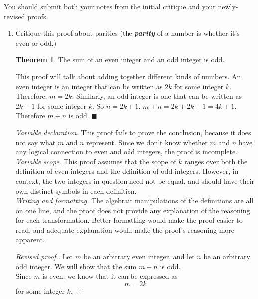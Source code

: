 \documentclass{article}
\renewcommand{\(}{\left(}
\renewcommand{\)}{\right)}
\renewcommand\qedsymbol{$\blacksquare$}
\newenvironment{prf}{{\bfseries Proof.}}{\qedsymbol}
\theoremstyle{plain}
\theoremstyle{plain}
\theoremstyle{definition}
\newtheorem*{thm}{Theorem}
\begin{document}
You should submit both your notes from the initial critique and your newly-revised proofs.

\pagebreak

\begin{enumerate}[label*=\roman*.,ref=\roman*]
    \item Critique this proof about parities (the \textit{\textbf{parity}} of a number is whether it's even or odd.)
    \begin{thm}
     The sum of an even integer and an odd integer is odd.
    \end{thm}
    \begin{prf}
    This proof will talk about adding together different kinds of numbers. An even integer is an integer that can be written as $2k$ for some integer $k$. Therefore, $m = 2k$. Similarly, an odd integer is one that can be written as $2k+1$ for some integer $k$. So $n = 2k+1$. $m + n = 2k + 2k + 1 = 4k + 1$. Therefore $m + n$ is odd.
    \end{prf}
    
    \begin{shaded}
    \textit{Variable declaration.} This proof fails to prove the conclusion, because it does not say what $m$ and $n$ represent. Since we don't know whether $m$ and $n$ have any logical connection to even and odd integers, the proof is incomplete. \\
    
    \textit{Variable scope.} This proof assumes that the scope of $k$ ranges over both the definition of even integers and the definition of odd integers. However, in context, the two integers in question need not be equal, and should have their own distinct symbols in each definition. \\
    
    \textit{Writing and formatting.} The algebraic manipulations of the definitions are all on one line, and the proof does not provide any explanation of the reasoning for each transformation. Better formatting would make the proof easier to read, and adequate explanation would make the proof's reasoning more apparent.
    
    \begin{proof}[Revised proof.]
    	Let $m$ be an arbitrary even integer, and let $n$ be an arbitrary odd integer. We will show that the sum $m + n$ is odd. \\
    	Since $m$ is even, we know that it can be expressed as
    	\begin{equation}
    	m = 2k
    	\end{equation}
    	for some integer $k$.
    	

\end{proof}
\end{shaded}
\end{enumerate}
\end{document}
